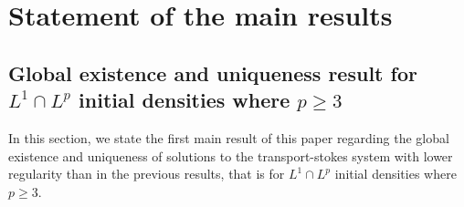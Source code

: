 \documentclass[10pt]{amsart}
\theoremstyle{definition}\newtheorem{defi}[theo]{Definition}\newtheorem{rema}[theo]{Remark}\newtheorem{exam}[theo]{Example}\newtheorem{exem}[theo]{Example}\newtheorem{nota}[theo]{Notation}
\renewcommand{\geq}{\geqslant}
\begin{document}
\section{Statement of the main results}

\subsection{Global existence and uniqueness result for \texorpdfstring{$L^1 \cap L^p$}{L1 n Lp} initial densities where \texorpdfstring{$p \geq 3$}{p>=3}}

In this section, we state the first main result of this paper regarding the global existence and uniqueness of solutions to the transport-stokes system with lower regularity than in the previous results, that is for $L^1 \cap L^p$ initial densities where $p \geq 3$.
\end{document}
